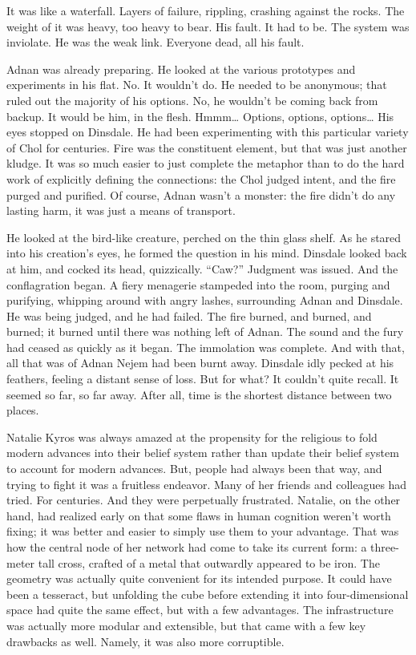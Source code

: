 It was like a waterfall. Layers of failure, rippling, crashing against the rocks. The weight of it was heavy, too heavy to bear. His fault. It had to be. The system was inviolate. He was the weak link. Everyone dead, all his fault.

Adnan was already preparing. He looked at the various prototypes and experiments in his flat. No. It wouldn’t do. He needed to be anonymous; that ruled out the majority of his options. No, he wouldn’t be coming back from backup. It would be him, in the flesh.
\SmallVSpace
Hmmm… Options, options, options…
\SmallVSpace
His eyes stopped on Dinsdale. He had been experimenting with this particular variety of Chol for centuries. Fire was the constituent element, but that was just another kludge. It was so much easier to just complete the metaphor than to do the hard work of explicitly defining the connections: the Chol judged intent, and the fire purged and purified. Of course, Adnan wasn’t a monster: the fire didn’t do any lasting harm, it was just a means of transport.

He looked at the bird-like creature, perched on the thin glass shelf. As he stared into his creation’s eyes, he formed the question in his mind. Dinsdale looked back at him, and cocked its head, quizzically.
\SmallVSpace
“Caw?”
\SmallVSpace
Judgment was issued. And the conflagration began. A fiery menagerie stampeded into the room, purging and purifying, whipping around with angry lashes, surrounding Adnan and Dinsdale. He was being judged, and he had failed. The fire burned, and burned, and burned; it burned until there was nothing left of Adnan. The sound and the fury had ceased as quickly as it began.
\SmallVSpace
The immolation was complete. And with that, all that was of Adnan Nejem had been burnt away.
\SomeVSpace
Dinsdale idly pecked at his feathers, feeling a distant sense of loss. But for what? It couldn’t quite recall. It seemed so far, so far away. After all, time is the shortest distance between two places.
\simpleline
{}

Natalie Kyros was always amazed at the propensity for the religious to fold modern advances into their belief system rather than update their belief system to account for modern advances. But, people had always been that way, and trying to fight it was a fruitless endeavor. Many of her friends and colleagues had tried. For centuries. And they were perpetually frustrated.
\SmallVSpace
Natalie, on the other hand, had realized early on that some flaws in human cognition weren’t worth fixing; it was better and easier to simply use them to your advantage. That was how the central node of her network had come to take its current form: a three-meter tall cross, crafted of a metal that outwardly appeared to be iron.
\SmallVSpace
The geometry was actually quite convenient for its intended purpose. It could have been a tesseract, but unfolding the cube before extending it into four-dimensional space had quite the same effect, but with a few advantages. The infrastructure was actually more modular and extensible, but that came with a few key drawbacks as well. Namely, it was also more corruptible.

